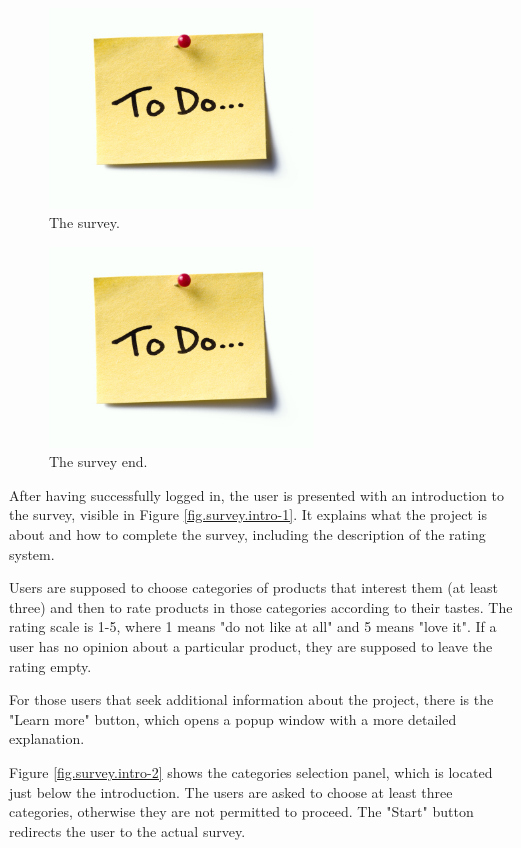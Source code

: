 \documentclass[12pt]{report}
\begin{document}
\begin{figure}[!t]
\centering
\includegraphics[width=7cm]{todo.jpg} 
\caption[The survey.]{The survey.}
\label{fig.survey}
\end{figure}

\begin{figure}[!t]
\centering
\includegraphics[width=7cm]{todo.jpg} 
\caption[The survey end.]{The survey end.}
\label{fig.survey.end}
\end{figure}

After having successfully logged in, the user is presented with an introduction to the survey, visible in Figure \ref{fig.survey.intro-1}. It explains what the project is about and how to complete the survey, including the description of the rating system.

Users are supposed to choose categories of products that interest them (at least three) and then to rate products in those categories according to their tastes. The rating scale is 1-5, where 1 means "do not like at all" and 5 means "love it". If a user has no opinion about a particular product, they are supposed to leave the rating empty.

For those users that seek additional information about the project, there is the "Learn more" button, which opens a popup window with a more detailed explanation.

Figure \ref{fig.survey.intro-2} shows the categories selection panel, which is located just below the introduction. The users are asked to choose at least three categories, otherwise they are not permitted to proceed. The "Start" button redirects the user to the actual survey.
\end{document}
